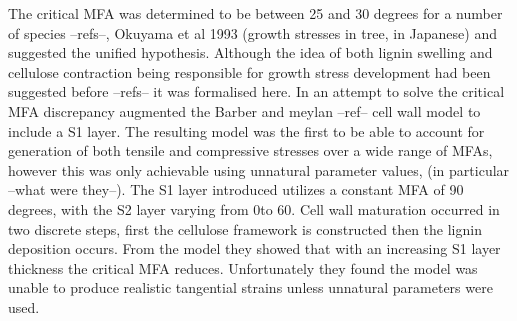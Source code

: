 The critical MFA was determined to be between
25 and 30 degrees for a number of species --refs--, Okuyama et al 1993 (growth
stresses in tree, in Japanese) and \cite{ISI:A1995QJ03000001} suggested the
unified hypothesis. Although the idea of both lignin swelling and cellulose
contraction being responsible for growth stress development had been suggested
before --refs-- it was formalised here. In an attempt to solve the critical MFA
discrepancy \cite{ISI:A1995QJ03000001} augmented the Barber and meylan --ref-- cell wall
model to include a S1 layer. The resulting model was the first to be able to
account for generation of both tensile and compressive stresses over a wide
range of MFAs, however this was only achievable using unnatural parameter values, (in
particular --what were they--). The S1 layer introduced utilizes a constant MFA
of 90 degrees, with the S2 layer varying from 0\celsius to 60\celsius. Cell wall maturation
occurred in two discrete steps, first the cellulose framework is constructed then
the lignin deposition occurs. From the model they showed that with an
increasing S1 layer thickness the critical MFA reduces. Unfortunately they found the model
was unable to produce realistic tangential strains unless unnatural parameters
were used.